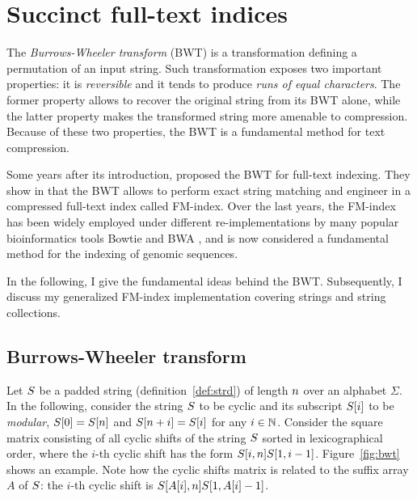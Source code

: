 \section{Succinct full-text indices}

The \emph{Burrows-Wheeler transform} (BWT) \citep{Burrows1994} is a transformation defining a permutation of an input string.
Such transformation exposes two important properties: it is \emph{reversible} and it tends to produce \emph{runs of equal characters}.
The former property allows to recover the original string from its BWT alone, while the latter property makes the transformed string more amenable to compression.
Because of these two properties, the BWT is a fundamental method for text compression.

Some years after its introduction, \citeauthor{Ferragina2000} proposed the BWT for full-text indexing.
They show in \citep{Ferragina2000} that the BWT allows to perform exact string matching and engineer in \citep{Ferragina2001} a compressed full-text index called FM-index.
Over the last years, the FM-index has been widely employed under different re-implementations by many popular bioinformatics tools \eg Bowtie \citep{Langmead2009} and BWA \citep{Li2009}, and is now considered a fundamental method for the indexing of genomic sequences.

In the following, I give the fundamental ideas behind the BWT.
Subsequently, I discuss my generalized FM-index implementation covering strings and string collections.

\subsection{Burrows-Wheeler transform}
\label{sec:index:bwt}

Let $S$ be a padded string (definition~\ref{def:strd}) of length $n$ over an alphabet $\Sigma$.
In the following, consider the string $S$ to be cyclic and its subscript $S[i]$ to be \emph{modular}, \eg $S[0] = S[n]$ and $S[n+i] = S[i]$ for any $i \in \mathbb {N}$.
Consider the square matrix consisting of all cyclic shifts of the string $S$ sorted in lexicographical order, where the $i$-th cyclic shift has the form $S[i,n] S[1,i-1]$.
Figure~\ref{fig:bwt} shows an example.
Note how the cyclic shifts matrix is related to the suffix array $A$ of $S$: the $i$-th cyclic shift is $S[A[i],n] S[1,A[i]-1]$.

